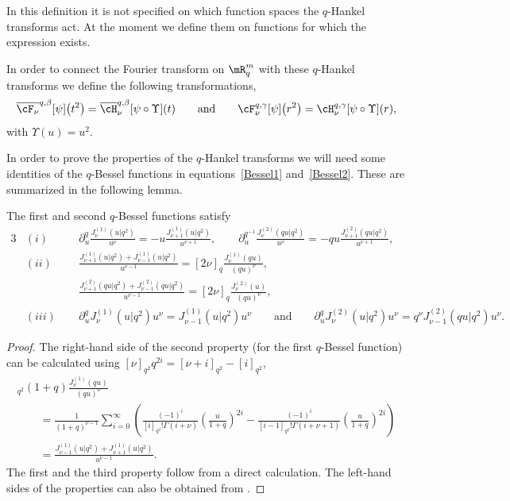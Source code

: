 In this def\/inition it is not specif\/ied on which function spaces the $q$-Hankel transforms act. At the moment we def\/ine them on functions for which the expression exists.

In order to connect the Fourier transform on $\mR^m_q$ with these $q$-Hankel transforms we def\/ine the following transformations,
\begin{gather*}
\overline{\cF_{\nu}}^{q,\beta}[\psi]\big(t^2\big)=\overline{\cH}_{\nu}^{q,\beta}[\psi\circ\Upsilon](t)
\qquad \mbox{and} \qquad \cF_{\nu}^{q,\gamma}[\psi]\big(r^2\big)=\cH_{\nu}^{q,\gamma}[\psi\circ\Upsilon](r),
\end{gather*}
with $\Upsilon(u)=u^2$.





In order to prove the properties of the $q$-Hankel transforms we will need some identities of the $q$-Bessel functions in equations~\eqref{Bessel1} and~\eqref{Bessel2}. These are summarized in the following lemma.

\begin{lemma}
\label{lemBessel1}
The first and second $q$-Bessel functions satisfy
\begin{alignat*}{3}
& (i)& &\partial_u^q\frac{J_{\nu}^{(1)}(u|q^2)}{u^\nu}=-u\frac{J_{\nu+1}^{(1)}(u|q^2)}{u^{\nu+1}},\qquad \partial_u^{q^{-1}}\frac{J_{\nu}^{(2)}(qu|q^2)}{u^\nu}=-qu\frac{J_{\nu+1}^{(2)}(qu|q^2)}{u^{\nu+1}}, &\\
& (ii)& &\frac{J_{\nu+1}^{(1)}(u|q^2)+J_{\nu-1}^{(1)}(u|q^2)}{u^{\nu-1}}=[2\nu]_q\frac{J_{\nu}^{(1)}(qu)}{(qu)^\nu},& \\ &&& \frac{J_{\nu+1}^{(2)}(qu|q^2)+J_{\nu-1}^{(2)}(qu|q^2)}{u^{\nu-1}}=[2\nu]_q\frac{J_{\nu}^{(2)}(u)}{(qu)^\nu},&\\
& (iii) \ \ & &\partial_u^q J_{\nu}^{(1)}(u|q^2)u^\nu=J_{\nu-1}^{(1)}(u|q^2)u^\nu\qquad
 \mbox{and}\qquad \partial_u^q J_{\nu}^{(2)}(u|q^2)u^\nu=q^\nu J_{\nu-1}^{(2)}(qu|q^2)u^\nu.&
\end{alignat*}
\end{lemma}

\begin{proof}
The right-hand side of the second property (for the f\/irst $q$-Bessel function) can be calculated using $[\nu]_{q^2}q^{2i}=[\nu+i]_{q^2}-[i]_{q^2}$,
\begin{gather*}
[\nu]_{q^2}(1+q)\frac{J_\nu^{(1)}(qu)}{(qu)^\nu} \\
\qquad{}
=\frac{1}{(1+q)^{\nu-1}}\sum_{i=0}^\infty\left(\frac{(-1)^i}{[i]_{q^2}!\Gamma(i+\nu)}\left(\frac{u}{1+q}\right)^{2i}
-\frac{(-1)^i}{[i-1]_{q^2}!\Gamma(i+\nu+1)}\left(\frac{u}{1+q}\right)^{2i}\right)\\
\qquad{} =\frac{J_{\nu-1}^{(1)}(u|q^2)+J_{\nu+1}^{(1)}(u|q^2)}{u^{\nu-1}}.
\end{gather*}
The f\/irst and the third property follow from a direct calculation. The left-hand sides of the properties can also be obtained from \cite[Exercise~1.25]{MR1052153}.
\end{proof}


